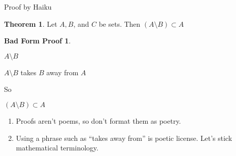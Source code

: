 \documentclass[fleqn]{beamer}
\theoremstyle{definition}
\newtheorem{myth}{Theorem}
\newtheorem{mybadformproof}{Bad Form Proof}
\begin{document}
\begin{frame}{Proof by Haiku }

\begin{myth}  Let \(A,B\), and \(C\) be sets.  Then \( \left (A \setminus B \right ) \subset A\)  \end{myth}

\begin{mybadformproof}
   \begin{center}  \( A \setminus B \) \end{center}

     \begin{center}  \( A \setminus B \)  takes $B$ away from \(A\) \end{center}

     \begin{center}  So   \end{center}

     \begin{center}    \(\left(A \setminus B \right) \subset A\)  \end{center}

\end{mybadformproof}

\begin{enumerate}

\item Proofs aren't poems, so don't format them as poetry.

\item Using a phrase such as ``takes away from'' is poetic license.  Let's stick mathematical terminology.
\end{enumerate}
\end{frame}
\end{document}
